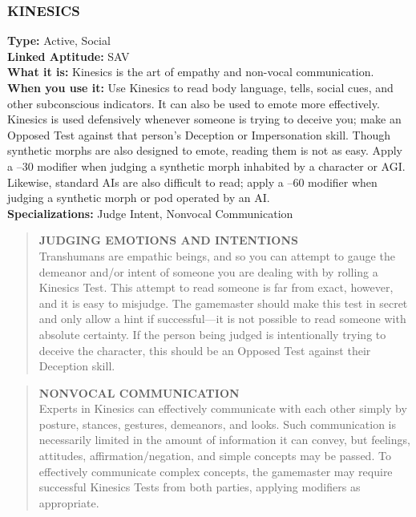 \subsubsection{KINESICS}
\textbf{Type:} Active, Social
\\ \textbf{Linked Aptitude:} SAV
\\ \textbf{What it is:} Kinesics is the art of empathy and non-vocal communication.
\\ \textbf{When you use it:} Use Kinesics to read body language,
tells, social cues, and other subconscious indicators. It
can also be used to emote more effectively. Kinesics
is used defensively whenever someone is trying to deceive you; make an Opposed Test against that person’s
Deception or Impersonation skill.
Though synthetic morphs are also designed to
emote, reading them is not as easy. Apply a –30 modifier when judging a synthetic morph inhabited by a
character or AGI. Likewise, standard AIs are also difficult to read; apply a –60 modifier when judging a
synthetic morph or pod operated by an AI.
\\ \textbf{Specializations:} Judge Intent, Nonvocal Communication

\begin{quotation}
\textbf{JUDGING EMOTIONS AND INTENTIONS}
\\
Transhumans are empathic beings, and so you can
attempt to gauge the demeanor and/or intent of
someone you are dealing with by rolling a Kinesics
Test. This attempt to read someone is far from exact,
however, and it is easy to misjudge. The gamemaster
should make this test in secret and only allow a hint
if successful—it is not possible to read someone with
absolute certainty. If the person being judged is intentionally trying to deceive the character, this should be
an Opposed Test against their Deception skill.
\end{quotation}

\begin{quotation}
\textbf{NONVOCAL COMMUNICATION}
\\
Experts in Kinesics can effectively communicate
with each other simply by posture, stances, gestures,
demeanors, and looks. Such communication is necessarily limited in the amount of information it can
convey, but feelings, attitudes, affirmation/negation,
and simple concepts may be passed. To effectively
communicate complex concepts, the gamemaster may
require successful Kinesics Tests from both parties, applying modifiers as appropriate.
\end{quotation}

